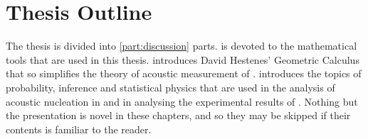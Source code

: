 %
%
%

\section{Thesis Outline}

The thesis is divided into \ref{part:discussion} parts.
 is devoted to the mathematical tools that are used in this thesis.
 introduces David Hestenes' Geometric Calculus that 
so simplifies the theory of acoustic measurement of .
 introduces the topics of probability, 
inference and statistical physics that are used 
in the analysis of acoustic nucleation in 
and in  analysing the experimental results of .
Nothing but the presentation is novel in these chapters,
and so they may be skipped if their contents is familiar to the reader.




